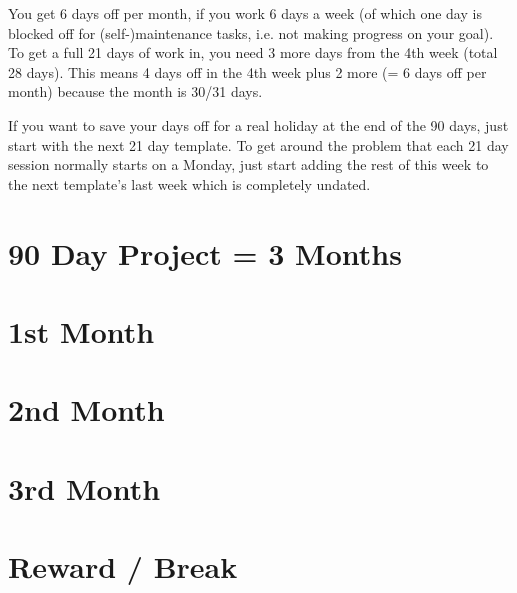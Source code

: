 

\newpage 


\twentyonedayprojectOneMonth
\newpage 

\twentyonedayprojectOneMonth
\newpage 

\twentyonedayprojectOneMonth

You get 6 days off per month, if you work 6 days a week (of which one day is blocked off for (self-)maintenance tasks, i.e. not making progress on your goal). To get a full 21 days of work in, you need 3 more days from the 4th week (total 28 days). This means 4 days off in the 4th week plus 2 more (= 6 days off per month) because the month is  30/31 days.  

If you want to save your days off for a real holiday at the end of the 90 days, just start with the next 21 day template. To get around the problem that each 21 day session normally starts on a Monday, just start adding the rest of this week to the next template's last week which is completely undated.

\newpage 

\section{90 Day Project = 3 Months}

\reviewboxes
\vspace{3em}

\ninetydayproject
\vspace{1em}

\newpage 
\section{1st Month}

\section{2nd Month}

\section{3rd Month}

\section{Reward / Break}


\eisenhower
\vspace{3em}

